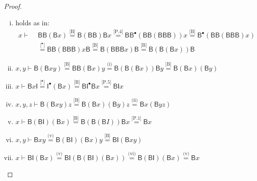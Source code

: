 \documentclass{llncs}
\begin{document}
\begin{proof}
  \begin{enumerate}[(i)]
  \item holds as in:
    \begin{align*}
      x \vdash \,\,& \mathsf{BB}(\mathsf{B}x)
        \overset{\text{[B]}}{=} \mathsf{B}(\mathsf{BB})\mathsf{B}x
        \overset{\text{[P.4]}}{=} \mathsf{BB}^\bullet(\mathsf{BB}(\mathsf{BBB}))x
        \overset{\text{[B]}}{=} \mathsf{B}^\bullet(\mathsf{BB}(\mathsf{BBB})x)
        \\& \overset{\text{[$^\bullet$]}}{=} \mathsf{BB}(\mathsf{BBB})x\mathsf{B}
        \overset{\text{[B]}}{=} \mathsf{B}(\mathsf{BBB}x)\mathsf{B}
        \overset{\text{[B]}}{=} \mathsf{B}(\mathsf{B}(\mathsf{B}x))\mathsf{B}
    \end{align*}
  \item $x,y \vdash \mathsf{B}(\mathsf{B}xy)
        \overset{\text{[B]}}{=} \mathsf{BB}(\mathsf{B}x)y
        \overset{\text{(i)}}{=} \mathsf{B}(\mathsf{B}(\mathsf{B}x))\mathsf{B}y
        \overset{\text{[B]}}{=} \mathsf{B}(\mathsf{B}x)(\mathsf{B}y)$
  \item $x \vdash \mathsf{B}x\mathsf{I}
      \overset{\text{[$^\bullet$]}}{=} \mathsf{I}^\bullet(\mathsf{B}x)
      \overset{\text{[B]}}{=} \mathsf{B}\mathsf{I}^\bullet\mathsf{B}x
      \overset{\text{[P.5]}}{=} \mathsf{B}\mathsf{I}x$
  
  \item $x,y,z \vdash \mathsf{B}(\mathsf{B}xy)z
        \overset{\text{[B]}}{=} \mathsf{B}(\mathsf{B}x)(\mathsf{B}y)z
        \overset{\text{(ii)}}{=} \mathsf{B}x(\mathsf{B}yz)$
        
  \item $x \vdash \mathsf{B}(\mathsf{BI})(\mathsf{B}x) \overset{\text{[B]}}{=} \mathsf{B}(\mathsf{B}(\mathsf{B}I))\mathsf{B}x \overset{\text{[P.1]}}{=} \mathsf{B}x$
        
  \item $x,y \vdash \mathsf{B}xy \overset{\text{(v)}}{=} \mathsf{B}(\mathsf{BI})(\mathsf{B}x)y \overset{\text{[B]}}{=} \mathsf{BI}(\mathsf{B}xy)$

  \item $x \vdash \mathsf{BI}(\mathsf{B}x) \overset{\text{(v)}}{=} \mathsf{BI}(\mathsf{B}(\mathsf{BI})(\mathsf{B}x)) \overset{\text{(vi)}}{=} \mathsf{B}(\mathsf{BI})(\mathsf{B}x) \overset{\text{(v)}}{=} \mathsf{B}x$
    
  \end{enumerate}
\end{proof}
\end{document}
